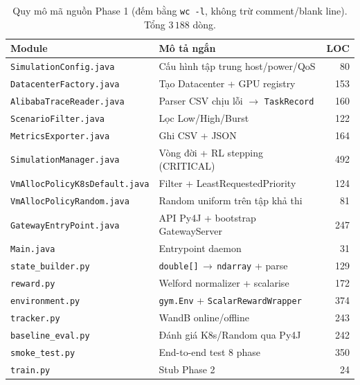 \begin{table}[H]
  \centering
  \caption{Quy mô mã nguồn Phase 1 (đếm bằng \texttt{wc -l}, không trừ
  comment/blank line). Tổng $3\,188$ dòng.}
  \label{tab:loc-summary}
  \footnotesize
  \begin{tabularx}{\linewidth}{l X r}
    \toprule
    \textbf{Module} & \textbf{Mô tả ngắn} & \textbf{LOC} \\
    \midrule
    \texttt{SimulationConfig.java}        & Cấu hình tập trung host/power/QoS                & 80   \\
    \texttt{DatacenterFactory.java}       & Tạo Datacenter + GPU registry                    & 153  \\
    \texttt{AlibabaTraceReader.java}      & Parser CSV chịu lỗi $\to$ \texttt{TaskRecord}    & 160  \\
    \texttt{ScenarioFilter.java}          & Lọc Low/High/Burst                               & 122  \\
    \texttt{MetricsExporter.java}         & Ghi CSV + JSON                                   & 164  \\
    \texttt{SimulationManager.java}       & Vòng đời + RL stepping (CRITICAL)                & 492  \\
    \texttt{VmAllocPolicyK8sDefault.java} & Filter + LeastRequestedPriority                  & 124  \\
    \texttt{VmAllocPolicyRandom.java}     & Random uniform trên tập khả thi                  & 81   \\
    \texttt{GatewayEntryPoint.java}       & API Py4J + bootstrap GatewayServer               & 247  \\
    \texttt{Main.java}                    & Entrypoint daemon                                & 31   \\
    \midrule
    \texttt{state\_builder.py}            & \texttt{double[]}\,$\to$\,\texttt{ndarray} + parse & 129  \\
    \texttt{reward.py}                    & Welford normalizer + scalarise                   & 172  \\
    \texttt{environment.py}               & \texttt{gym.Env} + \texttt{ScalarRewardWrapper}  & 374  \\
    \texttt{tracker.py}                   & WandB online/offline                             & 243  \\
    \texttt{baseline\_eval.py}            & Đánh giá K8s/Random qua Py4J                     & 242  \\
    \texttt{smoke\_test.py}               & End-to-end test 8 phase                          & 350  \\
    \texttt{train.py}                     & Stub Phase 2                                     & 24   \\
    \bottomrule
  \end{tabularx}
\end{table}

